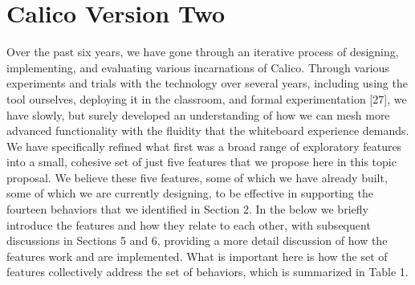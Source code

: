 \chapter{Calico Version Two}
\label{chapter:calico-version-two}

Over the past six years, we have gone through an iterative process of designing, implementing, and evaluating various incarnations of Calico. Through various experiments and trials with the technology over several years, including using the tool ourselves, deploying it in the classroom, and formal experimentation [27], we have slowly, but surely developed an understanding of how we can mesh more advanced functionality with the fluidity that the whiteboard experience demands. We have specifically refined what first was a broad range of exploratory features into a small, cohesive set of just five features that we propose here in this topic proposal. We believe these five features, some of which we have already built, some of which we are currently designing, to be effective in supporting the fourteen behaviors that we identified in Section 2. In the below we briefly introduce the features and how they relate to each other, with subsequent discussions in Sections 5 and 6, providing a more detail discussion of how the features work and are implemented. What is important here is how the set of features collectively address the set of behaviors, which is summarized in Table 1. 

